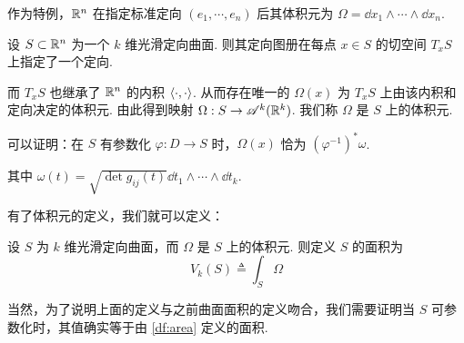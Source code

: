 作为特例，$\mathbb{R}^n$ 在指定标准定向 $(e_1,\cdots,e_n)$ 后其体积元为 $\Omega=\dd x_1\wedge\cdots\wedge\dd x_n$.


\begin{definition}
    设 $S\subset\mathbb{R}^n$ 为一个 $k$ 维光滑定向曲面. 则其定向图册在每点 $x\in S$ 的切空间 $T_xS$ 上指定了一个定向.

    而 $T_xS$ 也继承了 $\mathbb{R}^n$ 的内积 $\left\langle{\cdot,\cdot}\right\rangle$. 从而存在唯一的 $\Omega(x)$ 为 $T_xS$ 上由该内积和定向决定的体积元. 由此得到映射 $\Omega:S\to\mathscr{A}^k(\mathbb{R}^k)$. 我们称 $\Omega$ 是 $S$ 上的体积元.
\end{definition}

\begin{hint}
    可以证明：在 $S$ 有参数化 $\varphi:D\to S$ 时，$\Omega(x)$ 恰为 $(\varphi^{-1})^*\omega$.
    
    其中 $\omega(t)=\sqrt{\det g_{ij}(t)}\dd t_1\wedge\cdots\wedge\dd t_k$.
\end{hint}

有了体积元的定义，我们就可以定义：

\begin{definition}
    设 $S$ 为 $k$ 维光滑定向曲面，而 $\Omega$ 是 $S$ 上的体积元. 则定义 $S$ 的面积为
$$
V_k(S)\triangleq\int_S\Omega
$$
\end{definition}

当然，为了说明上面的定义与之前曲面面积的定义吻合，我们需要证明当 $S$ 可参数化时，其值确实等于由 \ref{df:area} 定义的面积.

